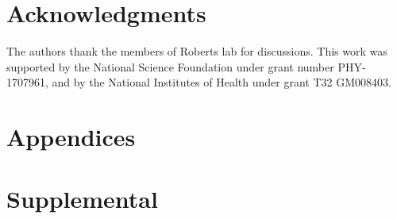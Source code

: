 \section*{Acknowledgments}
The authors thank the members of Roberts lab for discussions. This work was supported by the National Science Foundation under grant number PHY-1707961, and by the National Institutes of Health under grant T32 GM008403.

\newpage
\begin{subappendices}

%


\section{Appendices}





%

%
%

\newpage
\normalsize

\renewcommand{\thesection}{\arabic{chapter}.T}


\renewcommand{\thesection}{\arabic{chapter}.F}


\newpage
\renewcommand{\thesection}{\arabic{chapter}.S}
\section{Supplemental}



\end{subappendices}
%
